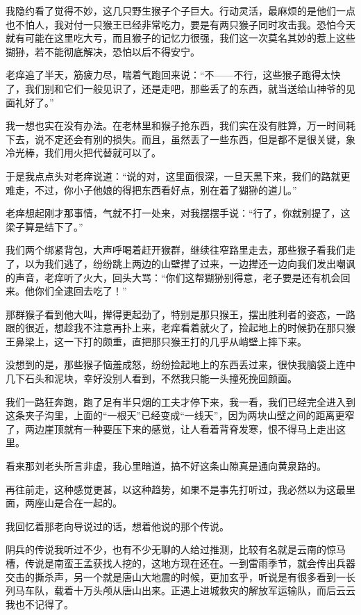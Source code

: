 我隐约看了觉得不妙，这几只野生猴子个子巨大。行动灵活，最麻烦的是他们一点也不怕人，我对付一只猴王已经非常吃力，要是有两只猴子同时攻击我。恐怕今天就有可能在这里吃大亏，而且猴子的记忆力很强，我们这一次莫名其妙的惹上这些猢狲，若不能彻底解决，恐怕以后不得安宁。

老痒追了半天，筋疲力尽，喘着气跑回来说：“不——不行，这些猴子跑得太快了，我们别和它们一般见识了，还是走吧，那些丢了的东西，就当送给山神爷的见面礼好了。”

我一想也实在没有办法。在老林里和猴子抢东西，我们实在没有胜算，万一时间耗下去，说不定还会有别的损失。而且，虽然丢了一些东西，但是都不是很关键，象冷光棒，我们用火把代替就可以了。

于是我点点头对老痒说道：“说的对，这里面很深，一旦天黑下来，我们的路就更难走，不过，你小子他娘的得把东西看好点，别在着了猢狲的道儿。”

老痒想起刚才那事情，气就不打一处来，对我摆摆手说：“行了，你就别提了，这梁子算是结下了。”

我们两个绑紧背包，大声呼喝着赶开猴群，继续往窄路里走去，那些猴子看我们走了，以为我们逃了，纷纷跳上两边的山壁撵了过来，一边撵还一边向我们发出嘲讽的声音，老痒听了火大，回头大骂：“你们这帮猢狲别得意，老子要是还有机会回来。他你们全逮回去吃了！”

那群猴子看到他大叫，撵得更起劲了，特别是那只猴王，摆出胜利者的姿态，一路跟的很近，想趁我不注意再扑上来，老痒看着就火了，捡起地上的时候扔在那只猴王鼻梁上，这一下打的颇重，直把那只猴王打的几乎从峭壁上摔下来。

没想到的是，那些猴子恼羞成怒，纷纷捡起地上的东西丢过来，很快我脑袋上连中几下石头和泥块，幸好没别人看到，不然我只能一头撞死挽回颜面。

我们一路狂奔跑，跑了足有半只烟的工夫才停下来，我一看，我们已经完全进入到这条夹子沟里，上面的“一根天”已经变成“一线天”，因为两块山壁之间的距离更窄了，两边崖顶就有一种要压下来的感觉，让人看着背脊发寒，恨不得马上走出这里。

看来那刘老头所言非虚，我心里暗道，搞不好这条山隙真是通向黄泉路的。

再往前走，这种感觉更甚，以这种趋势，如果不是事先打听过，我必然以为这最里面，两座山是合在一起的。

我回忆着那老向导说过的话，想着他说的那个传说。

阴兵的传说我听过不少，也有不少无聊的人给过推测，比较有名就是云南的惊马槽，传说是南蛮王孟获找人挖的，这地方现在还在。一到雷雨季节，就会传出兵器交击的撕杀声，另一个就是唐山大地震的时候，更加玄乎，听说是有很多看到一长列马车队，载着十万头颅从唐山出来。正遇上进城救灾的解放军运输队，而后云云我也不记得了。

